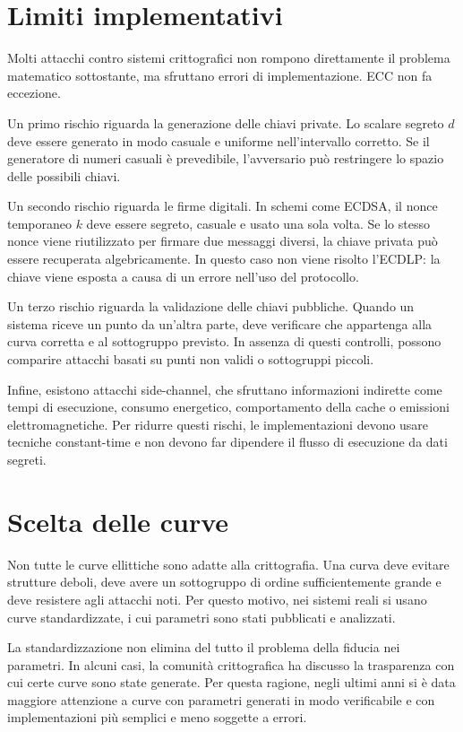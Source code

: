 \documentclass[12pt,a4paper,oneside]{report}
\begin{document}
\section{Limiti implementativi}

Molti attacchi contro sistemi crittografici non rompono direttamente il problema matematico sottostante, ma sfruttano errori di implementazione. ECC non fa eccezione.

Un primo rischio riguarda la generazione delle chiavi private. Lo scalare segreto \(d\) deve essere generato in modo casuale e uniforme nell'intervallo corretto. Se il generatore di numeri casuali è prevedibile, l'avversario può restringere lo spazio delle possibili chiavi.

Un secondo rischio riguarda le firme digitali. In schemi come ECDSA, il nonce temporaneo \(k\) deve essere segreto, casuale e usato una sola volta. Se lo stesso nonce viene riutilizzato per firmare due messaggi diversi, la chiave privata può essere recuperata algebricamente. In questo caso non viene risolto l'ECDLP: la chiave viene esposta a causa di un errore nell'uso del protocollo.

Un terzo rischio riguarda la validazione delle chiavi pubbliche. Quando un sistema riceve un punto da un'altra parte, deve verificare che appartenga alla curva corretta e al sottogruppo previsto. In assenza di questi controlli, possono comparire attacchi basati su punti non validi o sottogruppi piccoli.

Infine, esistono attacchi side-channel, che sfruttano informazioni indirette come tempi di esecuzione, consumo energetico, comportamento della cache o emissioni elettromagnetiche. Per ridurre questi rischi, le implementazioni devono usare tecniche constant-time e non devono far dipendere il flusso di esecuzione da dati segreti.

\section{Scelta delle curve}

Non tutte le curve ellittiche sono adatte alla crittografia. Una curva deve evitare strutture deboli, deve avere un sottogruppo di ordine sufficientemente grande e deve resistere agli attacchi noti. Per questo motivo, nei sistemi reali si usano curve standardizzate, i cui parametri sono stati pubblicati e analizzati.

La standardizzazione non elimina del tutto il problema della fiducia nei parametri. In alcuni casi, la comunità crittografica ha discusso la trasparenza con cui certe curve sono state generate. Per questa ragione, negli ultimi anni si è data maggiore attenzione a curve con parametri generati in modo verificabile e con implementazioni più semplici e meno soggette a errori.
\end{document}
